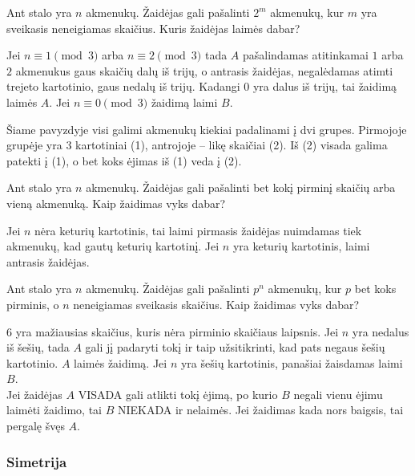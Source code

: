 \begin{pavnr}
  Ant stalo yra $n$ akmenukų. Žaidėjas gali pašalinti $2^{m}$ akmenukų, kur
  $m$ yra sveikasis neneigiamas skaičius. Kuris žaidėjas laimės dabar?
\end{pavnr}

Jei  $ n\equiv1\pmod{3} $ arba $ n\equiv2\pmod{3} $ tada $A$ pašalindamas
atitinkamai $1$ arba $2$ akmenukus gaus skaičių dalų iš trijų, o antrasis
žaidėjas, negalėdamas atimti trejeto kartotinio, gaus nedalų iš trijų.
Kadangi $0$ yra dalus iš trijų, tai žaidimą laimės $A$. Jei $ n\equiv0\pmod{3}
$ žaidimą laimi $B$.

\begin{pastaba}Šiame pavyzdyje visi galimi akmenukų kiekiai padalinami į
  dvi grupes. Pirmojoje grupėje yra $3$ kartotiniai (1), antrojoje – likę
  skaičiai (2). Iš (2) visada galima patekti į (1), o bet koks ėjimas iš
  (1) veda į (2).
\end{pastaba} 

\begin{pavnr}
  Ant stalo yra $n$ akmenukų. Žaidėjas gali pašalinti bet kokį pirminį skaičių
  arba vieną akmenuką. Kaip žaidimas vyks dabar?
\end{pavnr}

Jei $n$ nėra keturių kartotinis, tai laimi pirmasis žaidėjas nuimdamas tiek
akmenukų, kad gautų keturių kartotinį. Jei $n$ yra keturių kartotinis, laimi
antrasis žaidėjas. 

\begin{pavnr}
  Ant stalo yra $n$ akmenukų. Žaidėjas gali pašalinti $p^n$ akmenukų, kur
  $p$ bet koks pirminis, o $n$ neneigiamas sveikasis  skaičius. Kaip
  žaidimas vyks dabar?  
\end{pavnr}

$6$ yra mažiausias skaičius, kuris nėra pirminio skaičiaus laipsnis. Jei $n$
yra nedalus iš šešių, tada $A$ gali jį padaryti tokį ir taip užsitikrinti,
kad pats negaus šešių kartotinio. $A$ laimės žaidimą. Jei $n$ yra šešių
kartotinis, panašiai žaisdamas laimi $B$.\\

Jei žaidėjas $A$ VISADA gali atlikti tokį ėjimą, po kurio $B$ negali vienu
ėjimu laimėti žaidimo, tai $B$ NIEKADA ir nelaimės. Jei žaidimas kada nors
baigsis, tai pergalę švęs $A$. 

\subsubsection{Simetrija}

